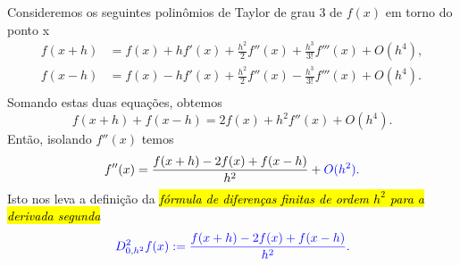 Consideremos os seguintes polinômios de Taylor{\taylor} de grau 3 de $f(x)$ em torno do ponto x
\begin{align}
  f(x+h) &= f(x) + hf'(x) + \frac{h^2}{2}f''(x) + \frac{h^3}{3!}f'''(x) + O(h^4),\\
  f(x-h) &= f(x) - hf'(x) + \frac{h^2}{2}f''(x) - \frac{h^3}{3!}f'''(x) + O(h^4).\\
\end{align}
Somando estas duas equações, obtemos
\begin{equation}
  f(x+h)+f(x-h) = 2f(x) + h^2f''(x) + O(h^4).
\end{equation}
Então, isolando $f''(x)$ temos
\begin{equation}
  f''(x) = \frac{f(x+h) - 2f(x) + f(x-h)}{h^2} + \color{blue}O(h^2).
\end{equation}
Isto nos leva a definição da \hl{\emph{fórmula de diferenças finitas de ordem $h^2$ para a derivada segunda}}
\begin{equation}\color{blue}D^2_{0,h^2} f(x) := \frac{f(x+h) - 2f(x) + f(x-h)}{h^2}.
\end{equation}

